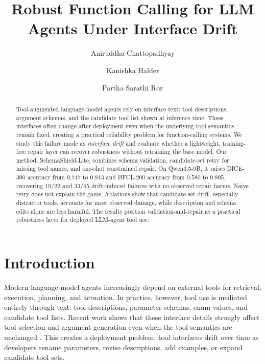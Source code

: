 \documentclass[runningheads]{llncs}
\newcommand{\method}{SchemaShield-Lite\xspace}
\begin{document}
\raggedbottom

\title{Robust Function Calling for LLM Agents Under Interface Drift}

\author{Aniruddha Chattopadhyay \and
Kanishka Halder \and
Partha Sarathi Roy}

\maketitle

\begin{abstract}
Tool-augmented language-model agents rely on interface text: tool descriptions,
argument schemas, and the candidate tool list shown at inference time. These
interfaces often change after deployment even when the underlying tool semantics
remain fixed, creating a practical reliability problem for function-calling
systems. We study this failure mode as \emph{interface drift} and evaluate whether
a lightweight, training-free repair layer can recover robustness without retraining
the base model. Our method, \method, combines schema validation, candidate-set
retry for missing tool names, and one-shot constrained repair. On Qwen3.5-9B, it
raises DICE-300 accuracy from $0.717$ to $0.813$ and BFCL-200 accuracy from
$0.580$ to $0.805$, recovering $19/22$ and $33/45$ drift-induced failures with no
observed repair harms. Naive retry does not explain the gains. Ablations show that
candidate-set drift, especially distractor tools, accounts for most observed
damage, while description and schema edits alone are less harmful. The results
position validation-and-repair as a practical robustness layer for deployed
LLM-agent tool use.
\end{abstract}

\section{Introduction}
Modern language-model agents increasingly depend on external tools for retrieval,
execution, planning, and actuation. In practice, however, tool use is mediated
entirely through text: tool descriptions, parameter schemas, enum values, and
candidate tool lists. Recent work shows that these interface details strongly affect
tool selection and argument generation
even when the tool semantics are unchanged \cite{guo2026rewrite,faghih2025gaming}.
This creates a deployment problem: tool interfaces drift over time as developers
rename parameters, revise descriptions, add examples, or expand candidate tool sets.
\end{document}
